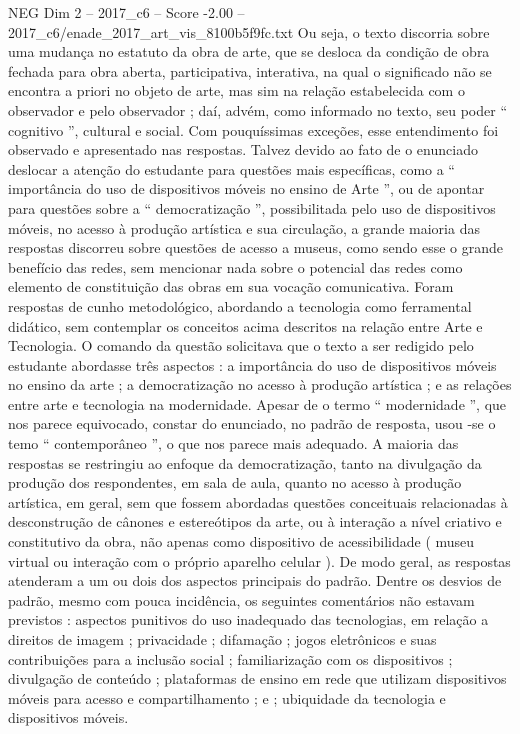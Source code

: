 \begin{textsample}{NEG Dim 2 – 2017\_c6 – Score -2.00 – 2017\_c6/enade\_2017\_art\_vis\_8100b5f9fc.txt}
Ou seja, o texto discorria sobre uma mudança no estatuto da obra de arte, que se desloca da condição de obra fechada para obra aberta, participativa, interativa, na qual o significado não se encontra a priori no objeto de arte, mas sim na relação estabelecida com o observador e pelo observador ; daí, advém, como informado no texto, seu poder “ cognitivo ”, cultural e social.
Com pouquíssimas exceções, esse entendimento foi observado e apresentado nas respostas.
Talvez devido ao fato de o enunciado deslocar a atenção do estudante para questões mais específicas, como a “ importância do uso de dispositivos móveis no ensino de Arte ”, ou de apontar para questões sobre a “ democratização ”, possibilitada pelo uso de dispositivos móveis, no acesso à produção artística e sua circulação, a grande maioria das respostas discorreu sobre questões de acesso a museus, como sendo esse o grande benefício das redes, sem mencionar nada sobre o potencial das redes como elemento de constituição das obras em sua vocação comunicativa.
Foram respostas de cunho metodológico, abordando a tecnologia como ferramental didático, sem contemplar os conceitos acima descritos na relação entre Arte e Tecnologia.
O comando da questão solicitava que o texto a ser redigido pelo estudante abordasse três aspectos : a importância do uso de dispositivos móveis no ensino da arte ; a democratização no acesso à produção artística ; e as relações entre arte e tecnologia na modernidade.
Apesar de o termo “ modernidade ”, que nos parece equivocado, constar do enunciado, no padrão de resposta, usou -se o temo “ contemporâneo ”, o que nos parece mais adequado.
A maioria das respostas se restringiu ao enfoque da democratização, tanto na divulgação da produção dos respondentes, em sala de aula, quanto no acesso à produção artística, em geral, sem que fossem abordadas questões conceituais relacionadas à desconstrução de cânones e estereótipos da arte, ou à interação a nível criativo e constitutivo da obra, não apenas como dispositivo de acessibilidade ( museu virtual ou interação com o próprio aparelho celular ).
De modo geral, as respostas atenderam a um ou dois dos aspectos principais do padrão.
Dentre os desvios de padrão, mesmo com pouca incidência, os seguintes comentários não estavam previstos : aspectos punitivos do uso inadequado das tecnologias, em relação a direitos de imagem ; privacidade ; difamação ; jogos eletrônicos e suas contribuições para a inclusão social ; familiarização com os dispositivos ; divulgação de conteúdo ; plataformas de ensino em rede que utilizam dispositivos móveis para acesso e compartilhamento ; e ; ubiquidade da tecnologia e dispositivos móveis.

\end{textsample}
